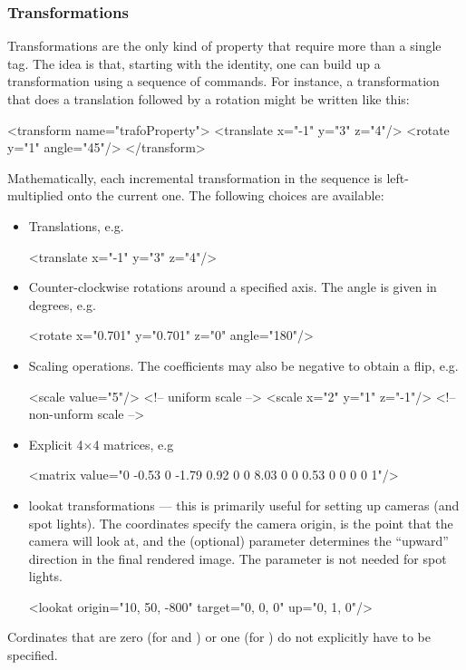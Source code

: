 \subsubsection{Transformations}
Transformations are the only kind of property that require more than a single tag. The idea is that, starting
with the identity, one can build up a transformation using a sequence of commands. For instance, a transformation that
does a translation followed by a rotation might be written like this:
\begin{xml}
<transform name="trafoProperty">
	<translate x="-1" y="3" z="4"/>
	<rotate y="1" angle="45"/>
</transform>
\end{xml}
Mathematically, each incremental transformation in the sequence is left-multiplied onto the current one. The following
choices are available:
\begin{itemize}
\item Translations, e.g.
\begin{xml}
<translate x="-1" y="3" z="4"/>
\end{xml}
\item Counter-clockwise rotations around a specified axis. The angle is given in degrees, e.g.
\begin{xml}
<rotate x="0.701" y="0.701" z="0" angle="180"/>
\end{xml}
\item Scaling operations. The coefficients may also be negative to obtain a flip, e.g.
\begin{xml}
<scale value="5"/>           <!-- uniform scale -->
<scale x="2" y="1" z="-1"/>  <!-- non-unform scale -->
\end{xml}
\item Explicit 4$\times$4 matrices, e.g
\begin{xml}
<matrix value="0 -0.53 0 -1.79 0.92 0 0 8.03 0 0 0.53 0 0 0 0 1"/>
\end{xml}
\item lookat transformations --- this is primarily useful for setting up cameras (and spot lights). The  coordinates
specify the camera origin,  is the point that the camera will look at, and the
(optional)  parameter determines the ``upward'' direction in the final rendered image.
The  parameter is not needed for spot lights.
\begin{xml}
<lookat origin="10, 50, -800" target="0, 0, 0" up="0, 1, 0"/>
\end{xml}
\end{itemize}
Cordinates that are zero (for  and ) or one (for )
do not explicitly have to be specified.
